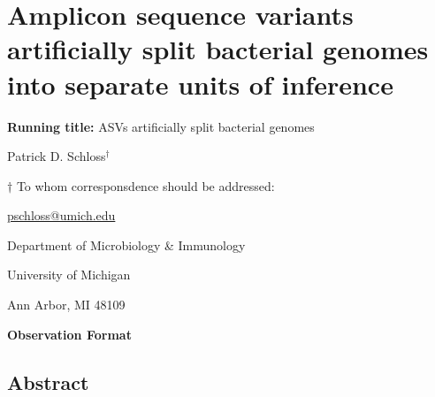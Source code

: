 \documentclass[
]{article}
\author{}
\date{\vspace{-2.5em}}
\begin{document}
\hypertarget{amplicon-sequence-variants-artificially-split-bacterial-genomes-into-separate-units-of-inference}{%
\section{Amplicon sequence variants artificially split bacterial genomes
into separate units of
inference}\label{amplicon-sequence-variants-artificially-split-bacterial-genomes-into-separate-units-of-inference}}

\vspace{20mm}

\textbf{Running title:} ASVs artificially split bacterial genomes

\vspace{20mm}

Patrick D. Schloss\({^\dagger}\)

\vspace{40mm}

\({\dagger}\) To whom corresponsdence should be addressed:

\href{mailto:pschloss@umich.edu}{pschloss@umich.edu}

Department of Microbiology \& Immunology

University of Michigan

Ann Arbor, MI 48109

\vspace{20mm}

\textbf{Observation Format}

\newpage

\hypertarget{abstract}{%
\subsection{Abstract}\label{abstract}}
\end{document}
